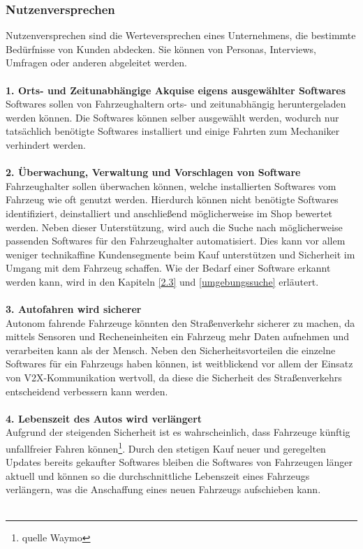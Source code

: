 \subsubsection{Nutzenversprechen} \label{nv}
Nutzenversprechen sind die Werteversprechen eines Unternehmens, die bestimmte Bedürfnisse von Kunden abdecken. Sie können von Personas, Interviews, Umfragen oder anderen abgeleitet werden.\\\\
\textbf{1. Orts- und Zeitunabhängige Akquise eigens ausgewählter Softwares}\\
Softwares sollen von Fahrzeughaltern orts- und zeitunabhängig heruntergeladen werden können. Die Softwares können selber ausgewählt werden, wodurch nur tatsächlich benötigte Softwares installiert und einige Fahrten zum Mechaniker verhindert werden.\\\\
\textbf{2. Überwachung, Verwaltung und Vorschlagen von Software}\\
Fahrzeughalter sollen überwachen können, welche installierten Softwares vom Fahrzeug wie oft genutzt werden. Hierdurch können nicht benötigte Softwares identifiziert, deinstalliert und anschließend möglicherweise im Shop bewertet werden. Neben dieser Unterstützung, wird auch die Suche nach möglicherweise passenden Softwares für den Fahrzeughalter automatisiert. Dies kann vor allem weniger technikaffine Kundensegmente beim Kauf unterstützen und Sicherheit im Umgang mit dem Fahrzeug schaffen. Wie der Bedarf einer Software erkannt werden kann, wird in den Kapiteln \ref{2.3} und \ref{umgebungssuche} erläutert.\\\\
\textbf{3. Autofahren wird sicherer}\\
Autonom fahrende Fahrzeuge könnten den Straßenverkehr sicherer zu machen, da mittels Sensoren und Recheneinheiten ein Fahrzeug mehr Daten aufnehmen und verarbeiten kann als der Mensch.\cite[Vgl. ]{b103} Neben den Sicherheitsvorteilen die einzelne Softwares für ein Fahrzeugs haben können, ist weitblickend vor allem der Einsatz von V2X-Kommunikation wertvoll, da diese die Sicherheit des Straßenverkehrs entscheidend verbessern kann werden.\cite[Vgl.]{bmd}\cite[Vgl. S. 19]{vda}\\\\
\textbf{4. Lebenszeit des Autos wird verlängert}\\
Aufgrund der steigenden Sicherheit ist es wahrscheinlich, dass Fahrzeuge künftig unfallfreier Fahren können\footnote{quelle Waymo}. Durch den stetigen Kauf neuer und geregelten Updates bereits gekaufter Softwares bleiben die Softwares von Fahrzeugen länger aktuell und können so die durchschnittliche Lebenszeit eines Fahrzeugs verlängern, was die Anschaffung eines neuen Fahrzeugs aufschieben kann.\\\\
